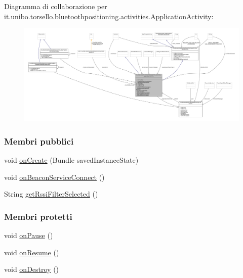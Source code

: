 Diagramma di collaborazione per it.\+unibo.\+torsello.\+bluetoothpositioning.\+activities.\+Application\+Activity\+:
\nopagebreak
\begin{figure}[H]
\begin{center}
\leavevmode
\includegraphics[width=350pt]{classit_1_1unibo_1_1torsello_1_1bluetoothpositioning_1_1activities_1_1ApplicationActivity__coll__graph}
\end{center}
\end{figure}
\subsubsection*{Membri pubblici}
\begin{DoxyCompactItemize}
\item 
void \hyperlink{classit_1_1unibo_1_1torsello_1_1bluetoothpositioning_1_1activities_1_1ApplicationActivity_a395bfa7ec016998b254b9e197ef8d754_a395bfa7ec016998b254b9e197ef8d754}{on\+Create} (Bundle saved\+Instance\+State)
\item 
void \hyperlink{classit_1_1unibo_1_1torsello_1_1bluetoothpositioning_1_1activities_1_1ApplicationActivity_a0cdfc0658ba462b43e9e6b94bab90da1_a0cdfc0658ba462b43e9e6b94bab90da1}{on\+Beacon\+Service\+Connect} ()
\item 
String \hyperlink{classit_1_1unibo_1_1torsello_1_1bluetoothpositioning_1_1activities_1_1ApplicationActivity_a54fb622e186f1a1e4af2b84b7466c560_a54fb622e186f1a1e4af2b84b7466c560}{get\+Rssi\+Filter\+Selected} ()
\end{DoxyCompactItemize}
\subsubsection*{Membri protetti}
\begin{DoxyCompactItemize}
\item 
void \hyperlink{classit_1_1unibo_1_1torsello_1_1bluetoothpositioning_1_1activities_1_1ApplicationActivity_a06ed1cf654098045b1317b25067af877_a06ed1cf654098045b1317b25067af877}{on\+Pause} ()
\item 
void \hyperlink{classit_1_1unibo_1_1torsello_1_1bluetoothpositioning_1_1activities_1_1ApplicationActivity_ad9e5c029636aac4d7baa2ca8695b3a18_ad9e5c029636aac4d7baa2ca8695b3a18}{on\+Resume} ()
\item 
void \hyperlink{classit_1_1unibo_1_1torsello_1_1bluetoothpositioning_1_1activities_1_1ApplicationActivity_a219ab2598668ab85771f3f8e3c6fec22_a219ab2598668ab85771f3f8e3c6fec22}{on\+Destroy} ()
\end{DoxyCompactItemize}
